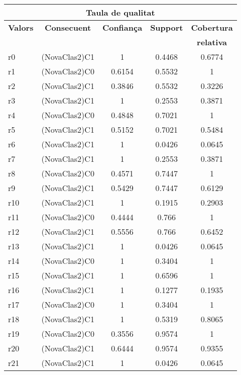 \begin{center}
\begin{tabular}{|p{3cm}|c|c|c|c|}
\hline
\multicolumn{5}{|c|}{\bf Taula de qualitat} \\ 
\hline
{\bf Valors} & {\bf Consecuent} & {\bf Confian\c ca} & {\bf Support} & {\bf Cobertura} \\ 
 & {\bf } & {\bf } & {\bf } & {\bf relativa} \\ 
\hline
\hline
r0 & (NovaClas2)C1 & 1 & 0.4468 & 0.6774 \\ 
\hline
r1 & (NovaClas2)C0 & 0.6154 & 0.5532 & 1 \\ 
\hline
r2 & (NovaClas2)C1 & 0.3846 & 0.5532 & 0.3226 \\ 
\hline
r3 & (NovaClas2)C1 & 1 & 0.2553 & 0.3871 \\ 
\hline
r4 & (NovaClas2)C0 & 0.4848 & 0.7021 & 1 \\ 
\hline
r5 & (NovaClas2)C1 & 0.5152 & 0.7021 & 0.5484 \\ 
\hline
r6 & (NovaClas2)C1 & 1 & 0.0426 & 0.0645 \\ 
\hline
r7 & (NovaClas2)C1 & 1 & 0.2553 & 0.3871 \\ 
\hline
r8 & (NovaClas2)C0 & 0.4571 & 0.7447 & 1 \\ 
\hline
r9 & (NovaClas2)C1 & 0.5429 & 0.7447 & 0.6129 \\ 
\hline
r10 & (NovaClas2)C1 & 1 & 0.1915 & 0.2903 \\ 
\hline
r11 & (NovaClas2)C0 & 0.4444 & 0.766 & 1 \\ 
\hline
r12 & (NovaClas2)C1 & 0.5556 & 0.766 & 0.6452 \\ 
\hline
r13 & (NovaClas2)C1 & 1 & 0.0426 & 0.0645 \\ 
\hline
r14 & (NovaClas2)C0 & 1 & 0.3404 & 1 \\ 
\hline
r15 & (NovaClas2)C1 & 1 & 0.6596 & 1 \\ 
\hline
r16 & (NovaClas2)C1 & 1 & 0.1277 & 0.1935 \\ 
\hline
r17 & (NovaClas2)C0 & 1 & 0.3404 & 1 \\ 
\hline
r18 & (NovaClas2)C1 & 1 & 0.5319 & 0.8065 \\ 
\hline
r19 & (NovaClas2)C0 & 0.3556 & 0.9574 & 1 \\ 
\hline
r20 & (NovaClas2)C1 & 0.6444 & 0.9574 & 0.9355 \\ 
\hline
r21 & (NovaClas2)C1 & 1 & 0.0426 & 0.0645 \\ 
\hline
\hline
\end{tabular}
\end{center} \vfill


